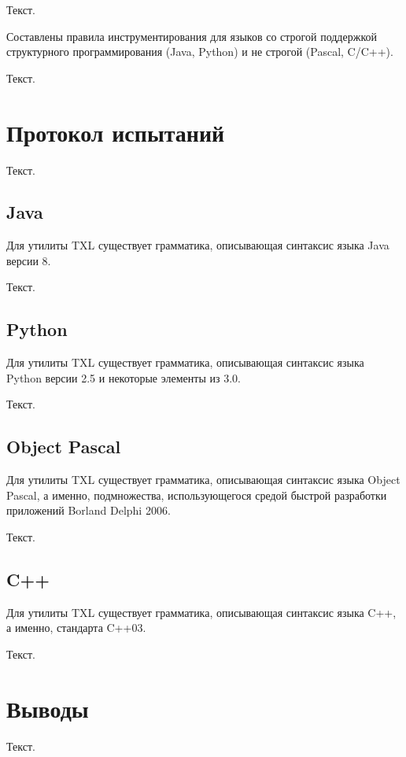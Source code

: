 Текст.

Составлены правила инструментирования для языков со строгой поддержкой структурного программирования (Java, Python) и не строгой (Pascal, C/C++).

Текст.

\section{Протокол испытаний}

Текст.

\subsection{Java}

Для утилиты TXL существует грамматика, описывающая синтаксис языка Java версии 8.

Текст.

\subsection{Python}

Для утилиты TXL существует грамматика, описывающая синтаксис языка Python версии 2.5 и некоторые элементы из 3.0.

Текст.

\subsection{Object Pascal}

Для утилиты TXL существует грамматика, описывающая синтаксис языка Object Pascal, а именно, подмножества, использующегося средой быстрой разработки приложений Borland Delphi 2006.

Текст.

\subsection{C++}

Для утилиты TXL существует грамматика, описывающая синтаксис языка C++, а именно, стандарта C++03.

Текст.

\section{Выводы}

Текст.
